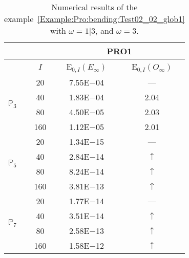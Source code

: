 \begin{table}[H]
\caption{Numerical results of the example~\ref{Example:Pro:bending:Test02_02_glob1} with $\omega=1|3$, and $\omega=3$.}
\setlength{\tabcolsep}{5pt}
\centering
\begin{tabular}{@{}l c c c@{}}
\toprule
 &  & \multicolumn{2}{c}{PRO1}\\
\midrule
 & $I$ & E$_{0,I}(E_{\infty})$ & E$_{0,I}(O_{\infty})$\\
\midrule
\multirow{4}{*}{$\mathbb{P}_{3}$} & 20 & 7.55E$-$04 & ---\\
 & 40 & 1.83E$-$04 & 2.04\\
 & 80 & 4.50E$-$05 & 2.03\\
 & 160 & 1.12E$-$05 & 2.01\\
\midrule
\multirow{4}{*}{$\mathbb{P}_{5}$} & 20 & 1.34E$-$15 & ---\\
 & 40 & 2.84E$-$14 & $\uparrow$\\
 & 80 & 8.24E$-$14 & $\uparrow$\\
 & 160 & 3.81E$-$13 & $\uparrow$\\
\midrule
\multirow{4}{*}{$\mathbb{P}_{7}$} & 20 & 1.77E$-$14 & ---\\
 & 40 & 3.51E$-$14 & $\uparrow$\\
 & 80 & 2.58E$-$13 & $\uparrow$\\
 & 160 & 1.58E$-$12 & $\uparrow$\\
\bottomrule
\end{tabular}
\label{Table:PRO:test_02_02_test3}
\end{table}
